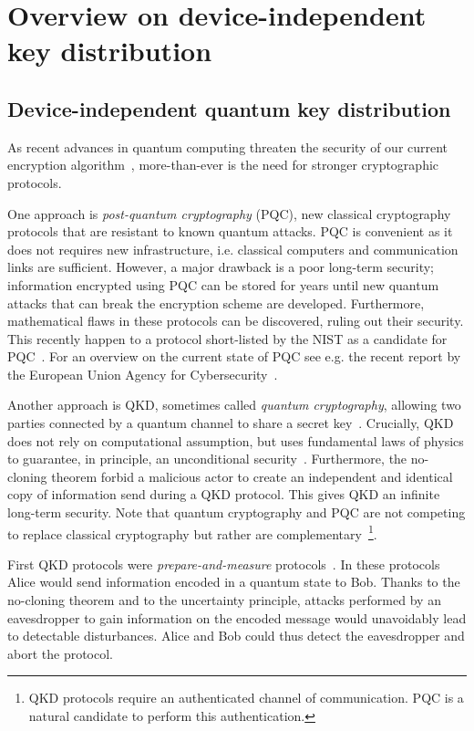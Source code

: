 \chapter{Overview on device-independent key distribution}

\section{Device-independent quantum key distribution}

As recent advances in quantum computing threaten the security of our current encryption algorithm~\cite{Shor1994,Gouzien2021,Gouzien2023}, more-than-ever is the need for stronger cryptographic protocols. 

One approach is \textit{post-quantum cryptography} (PQC), new classical cryptography protocols that are resistant to known quantum attacks.
PQC is convenient as it does not requires new infrastructure, i.e. classical computers and communication links are sufficient. 
However, a major drawback is a poor long-term security; information encrypted using PQC can be stored for years until new quantum attacks that can break the encryption scheme are developed. 
Furthermore, mathematical flaws in these protocols can be discovered, ruling out their security.
This recently happen to a protocol short-listed by the NIST as a candidate for PQC~\cite{Castryck2022}.
For an overview on the current state of PQC see e.g. the recent report by the European Union Agency for Cybersecurity~\cite{EUAC2021}.

Another approach is \acrfull{QKD}, sometimes called \textit{quantum cryptography}, allowing two parties connected by a quantum channel to share a secret key~\cite{Bennett84,Ekert1991,Scarani2009}.
Crucially, \acrshort{QKD} does not rely on computational assumption, but uses fundamental laws of physics to guarantee, in principle, an unconditional security~\cite{Shor2000,Mayers2001}.
Furthermore, the no-cloning theorem forbid a malicious actor to create an independent and identical copy of information send during a \acrshort{QKD} protocol.
This gives \acrshort{QKD} an infinite long-term security.
Note that quantum cryptography and PQC are not competing to replace classical cryptography but rather are complementary~\footnote{QKD protocols require an authenticated channel of communication. PQC is a natural candidate to perform this authentication.}.

\medbreak 

First \acrshort{QKD} protocols were \textit{prepare-and-measure} protocols~\cite{Bennett84,Grosshans2002,Grosshans2003}.
In these protocols Alice would send information encoded in a quantum state to Bob.
Thanks to the no-cloning theorem and to the uncertainty principle, attacks performed by an eavesdropper to gain information on the encoded message would unavoidably lead to detectable disturbances.
Alice and Bob could thus detect the eavesdropper and abort the protocol.

